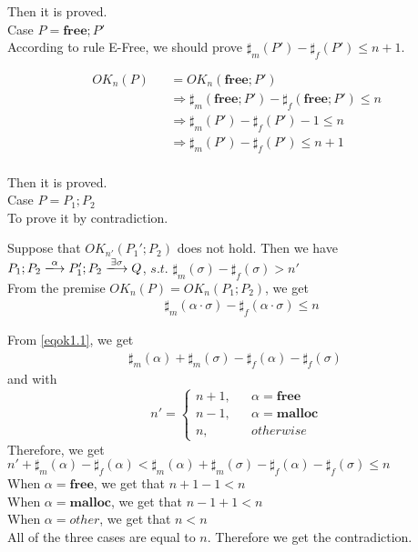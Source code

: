 \documentclass[english]{jssst_ppl} %
\newcommand\Malloc{\mathbf{malloc}}
\newcommand\Free{\mathbf{free}}
\theoremstyle{definition}
\begin{document}
Then it is proved.\\

\noindent Case $P = \Free;P'$ \\

According to rule E-Free, we should prove $\sharp_{m}(P') - \sharp_{f}(P') \le n+1$.

\begin{eqnarray*}
  OK_{n}(P)  & & =  OK_{n}(\Free;P')\\
  & &\Rightarrow  \sharp_{m}(\Free;P') - \sharp_{f}(\Free;P') \le n \\
  & & \Rightarrow \sharp_{m}(P')  - \sharp_{f}(P') - 1  \le n\\
  & & \Rightarrow \sharp_{m}(P')  - \sharp_{f}(P') \le n+1\\
\end{eqnarray*}

Then it is proved. \\

\noindent Case $P = P_{1};P_{2}$\\

To prove it by contradiction.

Suppose that $OK_{n'}(P_{1}';P_{2})$ does not hold. Then we have 
$P_{1};P_{2} \xlongrightarrow{\alpha} P_{1}';P_{2} \xlongrightarrow{\exists \sigma} Q$, $s.t.$ $\sharp_{m}(\sigma) - \sharp_{f}(\sigma) > n'$\\

From the premise $OK_{n}(P) = OK_{n}(P_{1};P_{2})$, we get 
\setcounter{equation}{0}
\begin{align}
  &  \sharp_{m}(\alpha \cdot \sigma) - \sharp_{f}(\alpha \cdot \sigma) \le n \label{eqok1.1}
\end{align}

From \eqref{eqok1.1}, we get
\begin{align}
\sharp_{m}(\alpha) + \sharp_{m}(\sigma) - \sharp_{f}(\alpha) - \sharp_{f}(\sigma) \  \label{eqok1.2}
\end{align}
and with
$$
   n'=\left\{
   \begin{aligned}
     n + 1, && \alpha = \Free \\
     n - 1,  && \alpha = \Malloc  \\
     n ,      && otherwise
   \end{aligned}
   \right.
$$
Therefore, we get \\
$n' + \sharp_{m}(\alpha) - \sharp_{f}(\alpha) < \sharp_{m}(\alpha) + \sharp_{m}(\sigma) - \sharp_{f}(\alpha) - \sharp_{f}(\sigma) \le n $ \\
When $\alpha = \Free$, we get that $n + 1 - 1 < n$\\
When $\alpha = \Malloc$, we get that $ n - 1 + 1 < n $ \\
When $ \alpha = other$,  we  get that $ n < n $ \\
 All of the three cases are equal to $n$. Therefore we get the contradiction.
\end{document}
